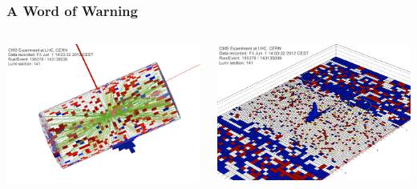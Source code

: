 \documentclass{beamer}
\begin{document}
\begin{frame}
  \frametitle{A Word of Warning}
  \begin{columns}
    \begin{column}{0.5\textwidth}
      \includegraphics[width=\textwidth]{figures/BeamHalo-195378_143135036_141_3DTower.png}\\
    \end{column}
    \begin{column}{0.5\textwidth}
      \includegraphics[width=\textwidth]{figures/BeamHalo-195378_143135036_141_Lego.png}\\
    \end{column}
  \end{columns}
  \begin{itemize}

\end{itemize}
\end{frame}
\end{document}
